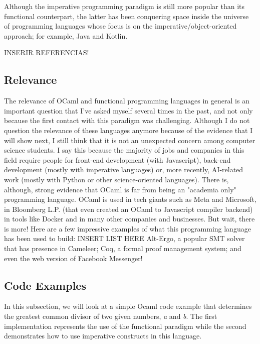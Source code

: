 {Although the imperative programming paradigm is still more popular than its functional counterpart, the latter has been conquering space inside the universe of programming languages whose focus is on the imperative/object-oriented approach; for example, Java and Kotlin.

INSERIR REFERENCIAS!

\subsection{Relevance} 
\label{sub:relevance}

The relevance of OCaml and functional programming languages in general is an important question that I've asked myself several times in the past, and not only because the first contact with this paradigm was challenging.
Although I do not question the relevance of these languages anymore because of the evidence that I will show next, I still think that it is not an unexpected concern among computer science students.
I say this because the majority of jobs and companies in this field require people for front-end development (with Javascript), back-end development (mostly with imperative languages) or, more recently, AI-related work (mostly with Python or other science-oriented languages).
There is, although, strong evidence that OCaml is far from being an "academia only" programming language.
OCaml is used in tech giants such as Meta and Microsoft, in Bloomberg L.P. (that even created an OCaml to Javascript compiler backend) in tools like Docker and in many other companies and businesses.
But wait, there is more! Here are a few impressive examples of what this programming language has been used to build: INSERT LIST HERE
Alt-Ergo, a popular SMT solver that has presence in Cameleer;
Coq, a formal proof management system;
and even the web version of Facebook Messenger!

\subsection{Code Examples} 
\label{sub:examples_ocaml}

In this subsection, we will look at a simple Ocaml code example that determines the greatest common divisor of two given numbers, \emph{a} and \emph{b}.
The first implementation represents the use of the functional paradigm while the second demonstrates how to use imperative constructs in this language.

}
